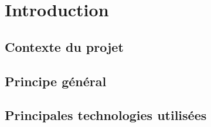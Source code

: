 \chapter{Introduction}

\section{Contexte du projet}



\section{Principe général}



\section{Principales technologies utilisées}

